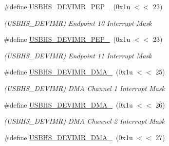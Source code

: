 \begin{DoxyCompactItemize}
\mbox{\label{group__SAMS70__USBHS_gacf5dcbb079ec3e4ec394ab4d1ec2e3f5}} 
\#define \mbox{\hyperlink{group__SAMS70__USBHS_gacf5dcbb079ec3e4ec394ab4d1ec2e3f5}{U\+S\+B\+H\+S\+\_\+\+D\+E\+V\+I\+M\+R\+\_\+\+P\+E\+P\+\_}}~(0x1u $<$$<$ 22)
\begin{DoxyCompactList}\small\item\em (U\+S\+B\+H\+S\+\_\+\+D\+E\+V\+I\+MR) Endpoint 10 Interrupt Mask \end{DoxyCompactList}\item 
\mbox{\label{group__SAMS70__USBHS_ga555e0be777ded08b48792e9b30baebd8}} 
\#define \mbox{\hyperlink{group__SAMS70__USBHS_ga555e0be777ded08b48792e9b30baebd8}{U\+S\+B\+H\+S\+\_\+\+D\+E\+V\+I\+M\+R\+\_\+\+P\+E\+P\+\_}}~(0x1u $<$$<$ 23)
\begin{DoxyCompactList}\small\item\em (U\+S\+B\+H\+S\+\_\+\+D\+E\+V\+I\+MR) Endpoint 11 Interrupt Mask \end{DoxyCompactList}\item 
\mbox{\label{group__SAMS70__USBHS_gaec1f297e81c46ad2484071b0bf34e859}} 
\#define \mbox{\hyperlink{group__SAMS70__USBHS_gaec1f297e81c46ad2484071b0bf34e859}{U\+S\+B\+H\+S\+\_\+\+D\+E\+V\+I\+M\+R\+\_\+\+D\+M\+A\+\_}}~(0x1u $<$$<$ 25)
\begin{DoxyCompactList}\small\item\em (U\+S\+B\+H\+S\+\_\+\+D\+E\+V\+I\+MR) D\+MA Channel 1 Interrupt Mask \end{DoxyCompactList}\item 
\mbox{\label{group__SAMS70__USBHS_ga8198e72dfb6ca7599705881f83faaaa5}} 
\#define \mbox{\hyperlink{group__SAMS70__USBHS_ga8198e72dfb6ca7599705881f83faaaa5}{U\+S\+B\+H\+S\+\_\+\+D\+E\+V\+I\+M\+R\+\_\+\+D\+M\+A\+\_}}~(0x1u $<$$<$ 26)
\begin{DoxyCompactList}\small\item\em (U\+S\+B\+H\+S\+\_\+\+D\+E\+V\+I\+MR) D\+MA Channel 2 Interrupt Mask \end{DoxyCompactList}\item 
\mbox{\label{group__SAMS70__USBHS_gadd1f31de85c1824a45c7343b3b44b9f8}} 
\#define \mbox{\hyperlink{group__SAMS70__USBHS_gadd1f31de85c1824a45c7343b3b44b9f8}{U\+S\+B\+H\+S\+\_\+\+D\+E\+V\+I\+M\+R\+\_\+\+D\+M\+A\+\_}}~(0x1u $<$$<$ 27)
$$
\end{DoxyCompactItemize}
